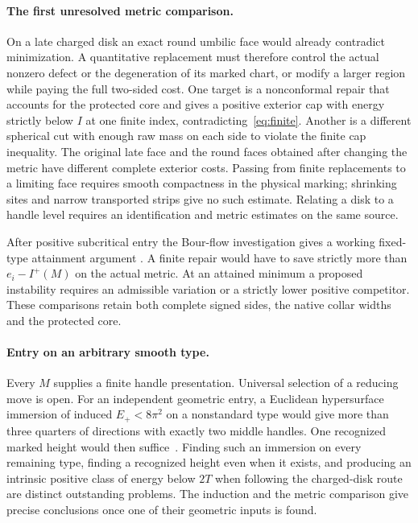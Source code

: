 \documentclass[11pt,letterpaper]{article}
\numberwithin{equation}{section}
\begin{document}
\paragraph{The first unresolved metric comparison.}
On a late charged disk an exact round umbilic face would already
contradict minimization. A quantitative replacement must therefore
control the actual nonzero defect or the degeneration of its marked
chart, or modify a larger region while paying the full two-sided
cost. One target is a nonconformal repair that accounts for the protected
core and gives a positive exterior cap with energy strictly below \(I\)
at one finite index, contradicting~\eqref{eq:finite}. Another is a
different spherical cut with enough raw mass on
each side to violate the finite cap inequality. The original late face and the
round faces obtained after changing the metric have different complete
exterior costs. Passing from finite replacements to a limiting face
requires smooth compactness in the physical marking; shrinking sites
and narrow transported strips give no such estimate. Relating a disk to
a handle level requires an identification and metric estimates on
the same source.

After positive subcritical entry the Bour-flow investigation gives
a working fixed-type attainment argument \cite{Baker2026BourAttainment}.
A finite repair would have to save strictly more than
\(e_i-I^+(M)\) on the actual metric. At an attained minimum a proposed
instability requires an admissible variation or a strictly lower positive
competitor. These comparisons retain both complete signed sides, the
native collar widths and the protected core.

\paragraph{Entry on an arbitrary smooth type.}
Every \(M\) supplies a finite handle presentation. Universal selection
of a reducing move is open. For an independent geometric entry, a
Euclidean hypersurface immersion of induced \(E_+<8\pi^2\) on a
nonstandard type would give more than three quarters of directions
with exactly two middle handles. One recognized marked height would
then suffice~\cite{Baker2026ImmersionEnergy,Baker2026MarkedHeights}.
Finding such an immersion on every remaining type, finding a recognized
height even when it exists, and producing an intrinsic positive
class of energy below \(2T\) when following the charged-disk route are
distinct outstanding problems. The induction and the metric comparison
give precise conclusions once one of their geometric inputs is found.

\begingroup
\raggedright


\endgroup
\end{document}
